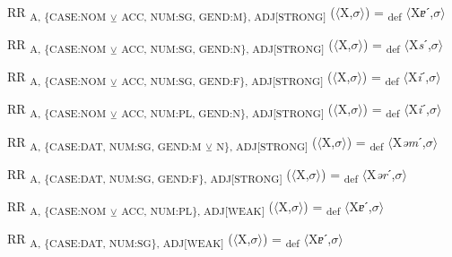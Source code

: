 {\begin{exe}
 RR \textsubscript{A, \{CASE:NOM} \textsubscript{${\veebar}$}\textsubscript{ ACC, NUM:SG, GEND:M\}, ADJ[STRONG]} ($\langle$X,$\sigma $$\rangle$) = \textsubscript{def} $\langle$X\textit{ɐ}ˊ,$\sigma $$\rangle$
\end{exe}

\begin{exe}
 RR \textsubscript{A, \{CASE:NOM} \textsubscript{${\veebar}$}\textsubscript{ ACC, NUM:SG, GEND:N\}, ADJ[STRONG]} ($\langle$X,$\sigma $$\rangle$) = \textsubscript{def} $\langle$X\textit{s}ˊ,$\sigma $$\rangle$
\end{exe}

\begin{exe}
 RR \textsubscript{A, \{CASE:NOM} \textsubscript{${\veebar}$}\textsubscript{ ACC, NUM:SG, GEND:F\}, ADJ[STRONG]} ($\langle$X,$\sigma $$\rangle$) = \textsubscript{def} $\langle$X\textit{i}ˊ,$\sigma $$\rangle$
\end{exe}

\begin{exe}
 RR \textsubscript{A, \{CASE:NOM} \textsubscript{${\veebar}$}\textsubscript{ ACC, NUM:PL, GEND:N\}, ADJ[STRONG]} ($\langle$X,$\sigma $$\rangle$) = \textsubscript{def} $\langle$X\textit{i}ˊ,$\sigma $$\rangle$
\end{exe}

\begin{exe}
 RR \textsubscript{A, \{CASE:DAT, NUM:SG, GEND:M} \textsubscript{${\veebar}$}\textsubscript{ N\}, ADJ[STRONG]} ($\langle$X,$\sigma $$\rangle$) = \textsubscript{def} $\langle$X\textit{əm}ˊ,$\sigma $$\rangle$
\end{exe}

\begin{exe}
 RR \textsubscript{A, \{CASE:DAT, NUM:SG, GEND:F\}, ADJ[STRONG]} ($\langle$X,$\sigma $$\rangle$) = \textsubscript{def} $\langle$X\textit{ər}ˊ,$\sigma $$\rangle$
\end{exe}

\begin{exe}
 RR \textsubscript{A, \{CASE:NOM} \textsubscript{${\veebar}$}\textsubscript{ ACC, NUM:PL\}, ADJ[WEAK]} ($\langle$X,$\sigma $$\rangle$) = \textsubscript{def} $\langle$X\textit{ɐ}ˊ,$\sigma $$\rangle$
\end{exe}

\begin{exe}
 RR \textsubscript{A, \{CASE:DAT, NUM:SG\}, ADJ[WEAK]} ($\langle$X,$\sigma $$\rangle$) = \textsubscript{def} $\langle$X\textit{ɐ}ˊ,$\sigma $$\rangle$
\end{exe}

}
